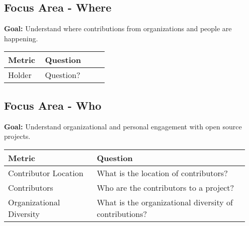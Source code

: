 
\subsection{Focus Area - Where}
\textbf{Goal:} Understand where contributions from organizations and people are happening.
\begin{table}[ht]
	\centering
	\begin{tabular}{| p{0.35\linewidth} | p{0.6\linewidth}|}
			\hline
			\hfil \textbf{Metric} & \hfil \textbf{Question} \\ 
			\hline
			Holder & Question? \\
			\hline
	\end{tabular}
\end{table}


\subsection{Focus Area - Who}
\textbf{Goal:} Understand organizational and personal engagement with open source projects.
\begin{table}[ht]
	\centering
	\begin{tabular}{| p{0.35\linewidth} | p{0.6\linewidth} |}
		\hline
		\hfil \textbf{Metric}  & \hfil \textbf{Question} \\ 
		\hline		
		Contributor Location & What is the location of contributors? \\
		\hline
		Contributors & Who are the contributors to a project? \\
		\hline
		Organizational Diversity & What is the organizational diversity of contributions? \\
		\hline
	\end{tabular}
\end{table}











